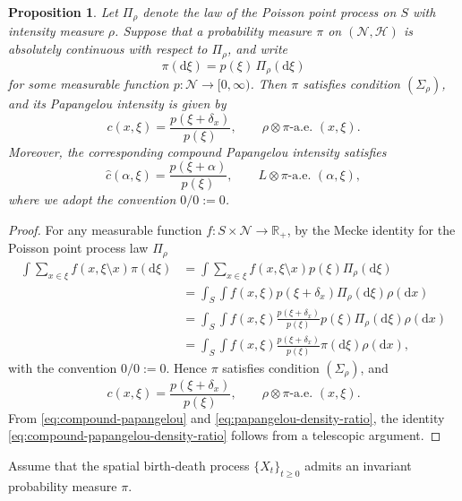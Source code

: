 \documentclass[12pt]{article}
\newtheorem{prop}[thm]{Proposition}
\newcommand{\R}{\mathbb{R}}
\newcounter{con}%
\numberwithin{equation}{section}
\begin{document}
\begin{prop}\label{prop:papangelou-density-ratio}
Let $\Pi_\rho$ denote the law of the Poisson point process on $S$ with intensity measure $\rho$. Suppose that a probability measure $\pi$ on $(\mathcal{N},\mathscr{H})$ is absolutely continuous with respect to $\Pi_\rho$, and write
$$
    \pi(\mathrm{d}\xi)=p(\xi)\,\Pi_\rho(\mathrm{d}\xi)
$$
for some measurable function $p:\mathcal{N}\to[0,\infty)$.
Then $\pi$ satisfies condition $(\Sigma_\rho)$, and its Papangelou intensity is given by
\begin{equation}\label{eq:papangelou-density-ratio}
    c(x,\xi)=\frac{p(\xi+\delta_x)}{p(\xi)},
    \qquad \rho\otimes\pi\text{-a.e. }(x,\xi).
\end{equation}
Moreover, the corresponding compound Papangelou intensity satisfies
\begin{equation}\label{eq:compound-papangelou-density-ratio}
    \widehat{c}(\alpha,\xi)=\frac{p(\xi+\alpha)}{p(\xi)},
    \qquad L\otimes\pi\text{-a.e. }(\alpha,\xi),
\end{equation}
where we adopt the convention $0/0:=0$.
\end{prop}
\begin{proof}
	For any measurable function $f:S\times\mathcal{N}\to\R_+$, by the Mecke identity for the Poisson point process law $\Pi_\rho$
\begin{align}
	\int\sum_{x\in\xi}f(x,\xi\setminus x)\pi(\mathrm{d}\xi)&=\int\sum_{x\in\xi}f(x,\xi\setminus x)p(\xi)\Pi_\rho(\mathrm{d}\xi)\nonumber\\
									&=\int_S\int f(x,\xi)p(\xi+\delta_x)\Pi_\rho(\mathrm{d}\xi)\rho(\mathrm{d}x)\nonumber\\
									&=\int_S\int f(x,\xi)\frac{p(\xi+\delta_x)}{p(\xi)}p(\xi)\Pi_\rho(\mathrm{d}\xi)\rho(\mathrm{d}x)\nonumber\\
									&=\int_S\int f(x,\xi)\frac{p(\xi+\delta_x)}{p(\xi)}\pi(\mathrm{d}\xi)\rho(\mathrm{d}x),
\end{align}
with the convention $0/0:=0$.
Hence $\pi$ satisfies condition $(\Sigma_\rho)$, and
$$
    c(x,\xi)=\frac{p(\xi+\delta_x)}{p(\xi)},
    \qquad \rho\otimes\pi\text{-a.e. }(x,\xi).
$$
From \eqref{eq:compound-papangelou} and \eqref{eq:papangelou-density-ratio}, the identity \eqref{eq:compound-papangelou-density-ratio} follows from a telescopic argument.
\end{proof}


Assume that the spatial birth-death process $\{X_t\}_{t\ge0}$ admits an invariant probability measure $\pi$.
\end{document}
